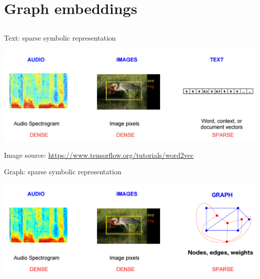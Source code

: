 \section{Graph embeddings}
\subsection{}

\begin{frame}{\alert{Text}: sparse symbolic representation}

\begin{center}
	\includegraphics[width=\textwidth]{figures/w2v}
\end{center}

\pause 

Image source: \url{https://www.tensorflow.org/tutorials/word2vec}
	
\end{frame}




\begin{frame}{\alert{Graph}: sparse symbolic representation}

\begin{center}
	\includegraphics[width=\textwidth]{figures/g2v}
\end{center}
	
\end{frame}
